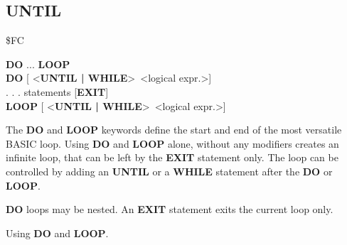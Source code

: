 \subsection{UNTIL}
\begin{description}[leftmargin=3cm,style=nextline]
\item [Token:] \$FC
\item [Format:] {\bf DO} ... {\bf LOOP} \\
                {\bf DO} [ <{\bf UNTIL | WHILE}> <logical expr.>] \\
                . . . statements [{\bf EXIT}] \\
                {\bf LOOP} [ <{\bf UNTIL | WHILE}> <logical expr.>]
\item [Usage:] The {\bf DO} and {\bf LOOP} keywords define
               the start and end of the most versatile BASIC loop.
               Using {\bf DO} and {\bf LOOP} alone, without any
               modifiers creates an infinite loop, that can be left
               by the {\bf EXIT} statement only. The loop can be
               controlled by adding an {\bf UNTIL} or a {\bf WHILE}
               statement after the {\bf DO} or {\bf LOOP}.

\item [Remarks:] {\bf DO} loops may be nested. An {\bf EXIT} statement
               exits the current loop only.
\item [Example:] Using {\bf DO} and {\bf LOOP}.
\end{description}


\newpage
